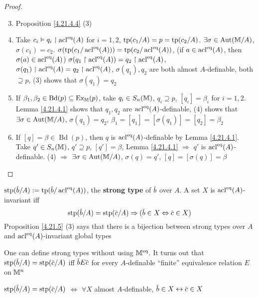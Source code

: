 \documentclass[11pt]{article}
\DeclareMathOperator{\Ex}{Ex}
\DeclareMathOperator{\Bd}{Bd}
\begin{document}
\begin{proof}
\begin{enumerate}
\setcounter{enumi}{2}
\item Proposition \ref{4.21.4.4} (3)
\item Take \(c_i\vDash q_i\upharpoonright\operatorname{acl}^{\operatorname{eq}}(A)\)
for \(i=1,2\), \(\operatorname{tp}(c_1/A)=p=\operatorname{tp}(c_2/A)\). \(\exists\sigma\in\operatorname{\text{Aut}}(\mathbb{M}/A)\), \(\sigma(c_1)=c_2\).
\(\sigma(\operatorname{tp}(c_1/\operatorname{acl}^{\operatorname{eq}}(A)))=\operatorname{tp}(c_2/\operatorname{acl}^{\operatorname{eq}}(A))\),
(if \(a\in\operatorname{acl}^{\operatorname{eq}}(A)\), then \(\sigma(a)\in\operatorname{acl}^{\operatorname{eq}}(A)\))
\(\sigma(q_1\upharpoonright\operatorname{acl}^{\operatorname{eq}}(A))=q_2\upharpoonright\operatorname{acl}^{\operatorname{eq}}(A)\),
\(\sigma(q_1)\upharpoonright\operatorname{acl}^{\operatorname{eq}}(A)=q_2\upharpoonright\operatorname{acl}^{\operatorname{eq}}(A)\),
\(\sigma(q_1),q_2\) are both almost \(A\)-definable, both \(\supseteq p\), (3) shows that \(\sigma(q_1)=q_2\)
\setcounter{enumi}{0}
\item If \(\beta_1,\beta_2\in\Bd(p)\subseteq\Ex_{\M}(p)\), take \(q_i\in S_n(\mathbb{M})\), \(q_i\supseteq p\), \([q_i]=\beta_i\)
for \(i=1,2\). Lemma \ref{4.21.4.1} shows that \(q_1,q_2\) are \(\operatorname{acl}^{\operatorname{eq}}(A)\)-definable, (4)
shows that \(\exists\sigma\in\operatorname{\text{Aut}}(\mathbb{M}/A)\), \(\sigma(q_1)=q_2\), \(\beta_1=[q_1]=[\sigma(q_1)]=[q_2]=\beta_2\)
\item If \([q]=\beta\in\Bd(p)\), then \(q\) is \(\operatorname{acl}^{\operatorname{eq}}(A)\)-definable by Lemma \ref{4.21.4.1}.
Take \(q'\in S_n(\mathbb{M})\), \(q'\supseteq p\), \([q']=\beta\), Lemma \ref{4.21.4.1} \(\Rightarrow\) \(q'\)
is \(\operatorname{acl}^{\operatorname{eq}}(A)\)-definable. (4) \(\Rightarrow\) \(\exists\sigma\in\operatorname{\text{Aut}}(\mathbb{M}/A)\), \(\sigma(q)=q'\), \([q]=[\sigma(q)]=\beta\)
\end{enumerate}
\end{proof}

\begin{remark}
\(\stp(\barb/A):=\tp(\barb/\acl^{\eq}(A))\), the \textbf{strong type} of \(\barb\) over \(A\). A
set \(X\) is \(\operatorname{acl}^{\operatorname{eq}}(A)\)-invariant iff
\begin{equation*}
\stp(\barb/A)=\stp(\barc/A)\Rightarrow(\barb\in X\Leftrightarrow\barc\in X)
\end{equation*}
Proposition \ref{4.21.5} (3) says that there is a bijection between strong types over \(A\)
and \(\operatorname{acl}^{\operatorname{eq}}(A)\)-invariant global types

One can define strong types without using \(\mathbb{M}^{\operatorname{eq}}\). It turns out
that \(\stp(\barb/A)=\stp(\barc/A)\) iff \(\barb E\barc\) for every \(A\)-definable ``finite''
equivalence relation \(E\) on \(\mathbb{M}^n\)

\(\stp(\barb/A)=\stp(\barc/A)\) \(\Leftrightarrow\) \(\forall X\) almost \(A\)-definable, \(\barb\in X\leftrightarrow\barc\in X\)
\end{remark}
\end{document}
